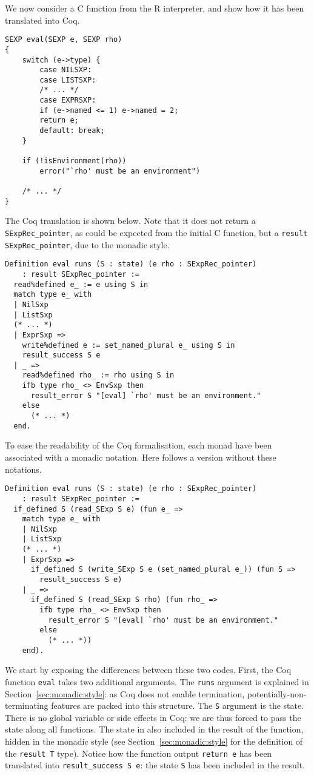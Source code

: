 \documentclass{article}
\newcommand\Coq{Coq}
\newcommand\R{R}
\newcommand\Cn{C}
\begin{document}
We now consider a \Cn{} function from the \R{} interpreter,
and show how it has been translated into \Coq{}.
\begin{verbatim}
SEXP eval(SEXP e, SEXP rho)
{
    switch (e->type) {
        case NILSXP:
        case LISTSXP:
        /* ... */
        case EXPRSXP:
        if (e->named <= 1) e->named = 2;
        return e;
        default: break;
    }

    if (!isEnvironment(rho))
        error("`rho' must be an environment")

    /* ... */
}
\end{verbatim}
The \Coq{} translation is shown below.
Note that it does not return a \texttt{SExpRec_pointer},
as could be expected from the initial \Cn{} function,
but a \texttt{result SExpRec_pointer},
due to the monadic style.
\begin{verbatim}
Definition eval runs (S : state) (e rho : SExpRec_pointer)
    : result SExpRec_pointer :=
  read%defined e_ := e using S in
  match type e_ with
  | NilSxp
  | ListSxp
  (* ... *)
  | ExprSxp =>
    write%defined e := set_named_plural e_ using S in
    result_success S e
  | _ =>
    read%defined rho_ := rho using S in
    ifb type rho_ <> EnvSxp then
      result_error S "[eval] `rho' must be an environment."
    else
      (* ... *)
  end.
\end{verbatim}
To ease the readability of the \Coq{} formalisation,
each monad have been associated with a monadic notation.
Here follows a version without these notations.
\begin{verbatim}
Definition eval runs (S : state) (e rho : SExpRec_pointer)
    : result SExpRec_pointer :=
  if_defined S (read_SExp S e) (fun e_ =>
    match type e_ with
    | NilSxp
    | ListSxp
    (* ... *)
    | ExprSxp =>
      if_defined S (write_SExp S e (set_named_plural e_)) (fun S =>
        result_success S e)
    | _ =>
      if_defined S (read_SExp S rho) (fun rho_ =>
        ifb type rho_ <> EnvSxp then
          result_error S "[eval] `rho' must be an environment."
        else
          (* ... *))
    end).
\end{verbatim}
We start by exposing the differences between these two codes.
First, the \Coq{} function \texttt{eval} takes two additional arguments.
The \texttt{runs} argument is explained in Section~\ref{sec:monadic:style}:
as \Coq{} does not enable termination, potentially-non-terminating features
are packed into this structure.
The \texttt{S} argument is the state.
There is no global variable or side effects in \Coq{}:
we are thus forced to pass the state along all functions.
The state in also included in the result of the function,
hidden in the monadic style
(see Section~\ref{sec:monadic:style} for the definition
of the \texttt{result T} type).
Notice how the function output \texttt{return e}
has been translated into \texttt{result_success S e}:
the state \texttt{S} has been included in the result.
\end{document}
